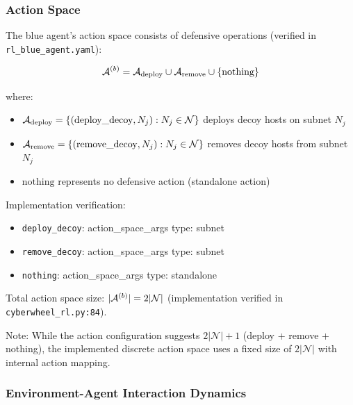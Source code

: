 \documentclass[12pt,twoside]{article}
\theoremstyle{definition}
\theoremstyle{plain}
\begin{document}
\subsubsection{Action Space}
The blue agent's action space consists of defensive operations (verified in \texttt{rl\_blue\_agent.yaml}):

\begin{equation}
\mathcal{A}^{(b)} = \mathcal{A}_{\text{deploy}} \cup \mathcal{A}_{\text{remove}} \cup \{\text{nothing}\}
\end{equation}

where:
\begin{itemize}
    \item $\mathcal{A}_{\text{deploy}} = \{(\text{deploy\_decoy}, N_j) : N_j \in \mathcal{N}\}$ deploys decoy hosts on subnet $N_j$
    \item $\mathcal{A}_{\text{remove}} = \{(\text{remove\_decoy}, N_j) : N_j \in \mathcal{N}\}$ removes decoy hosts from subnet $N_j$
    \item $\text{nothing}$ represents no defensive action (standalone action)
\end{itemize}

Implementation verification:
\begin{itemize}
    \item \texttt{deploy\_decoy}: action\_space\_args type: subnet
    \item \texttt{remove\_decoy}: action\_space\_args type: subnet  
    \item \texttt{nothing}: action\_space\_args type: standalone
\end{itemize}

Total action space size: $|\mathcal{A}^{(b)}| = 2|\mathcal{N}|$ (implementation verified in \texttt{cyberwheel\_rl.py:84}).

Note: While the action configuration suggests $2|\mathcal{N}| + 1$ (deploy + remove + nothing), the implemented discrete action space uses a fixed size of $2|\mathcal{N}|$ with internal action mapping.

\subsubsection{Environment-Agent Interaction Dynamics}
\end{document}
